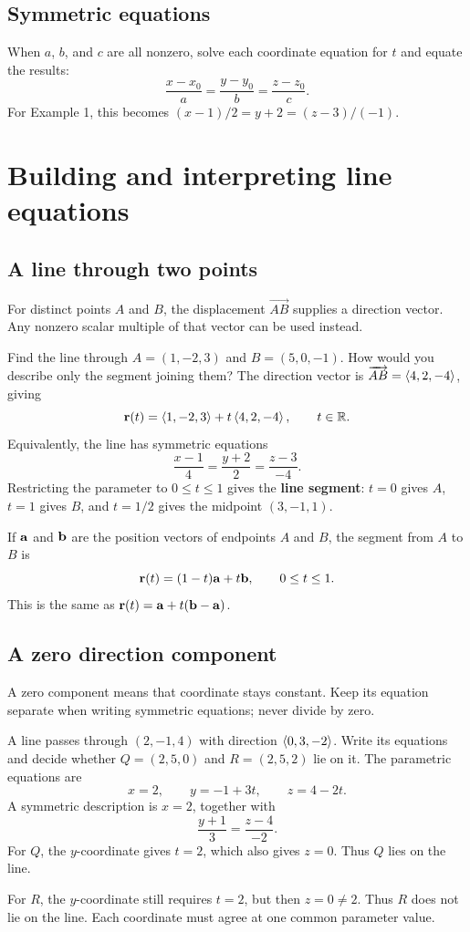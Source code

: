 \documentclass[11pt]{article}
\begin{document}
\subsection{Symmetric equations}
When $a$, $b$, and $c$ are all nonzero, solve each coordinate equation for
$t$ and equate the results:
\[
 \frac{x-x_0}{a}=\frac{y-y_0}{b}=\frac{z-z_0}{c}.
\]
For Example 1, this becomes $(x-1)/2=y+2=(z-3)/(-1)$.

\newpage
\section{Building and interpreting line equations}
\subsection{A line through two points}
For distinct points $A$ and $B$, the displacement $\vec{AB}$ supplies a
direction vector. Any nonzero scalar multiple of that vector can be used
instead.

\begin{example}{Find the line through $A=(1,-2,3)$ and $B=(5,0,-1)$.
How would you describe only the segment joining them?}
The direction vector is $\overrightarrow{AB}=\left\langle 4,2,-4\right\rangle$, giving
\[
 \mathbf{r}(t)=\left\langle 1,-2,3\right\rangle+t\left\langle 4,2,-4\right\rangle,\qquad t\in\mathbb{R}.
\]
Equivalently, the line has symmetric equations
\[
 \frac{x-1}{4}=\frac{y+2}{2}=\frac{z-3}{-4}.
\]
Restricting the parameter to $0\leq t\leq1$ gives the \textbf{line segment}:
$t=0$ gives $A$, $t=1$ gives $B$, and $t=1/2$ gives the midpoint $(3,-1,1)$.
\end{example}

\begin{definition}
If $\mathbf{a}$ and $\mathbf{b}$ are the position vectors of endpoints $A$ and $B$,
the segment from $A$ to $B$ is
\[
 \mathbf{r}(t)=(1-t)\mathbf{a}+t\mathbf{b},\qquad 0\leq t\leq1.
\]
This is the same as $\mathbf{r}(t)=\mathbf{a}+t(\mathbf{b}-\mathbf{a})$.
\end{definition}

\subsection{A zero direction component}
A zero component means that coordinate stays constant. Keep its equation
separate when writing symmetric equations; never divide by zero.

\begin{example}{A line passes through $(2,-1,4)$ with direction
$\left\langle 0,3,-2\right\rangle$. Write its equations and decide whether
$Q=(2,5,0)$ and $R=(2,5,2)$ lie on it.}
The parametric equations are
\[
 x=2,\qquad y=-1+3t,\qquad z=4-2t.
\]
A symmetric description is $x=2$, together with
\[
 \frac{y+1}{3}=\frac{z-4}{-2}.
\]
For $Q$, the $y$-coordinate gives $t=2$, which also gives $z=0$.
Thus $Q$ lies on the line.

For $R$, the $y$-coordinate still requires $t=2$, but then $z=0\ne2$.
Thus $R$ does not lie on the line. Each coordinate must agree at one
common parameter value.
\end{example}
\end{document}

